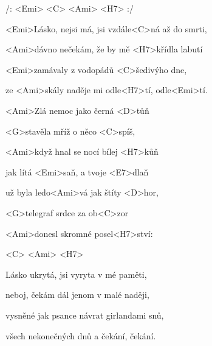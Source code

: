 

/: <Emi> <C> <Ami> <H7> :/

\zs
<Emi>Lásko, nejsi má, jsi vzdále<C>ná až do smrti,

<Ami>dávno nečekám, že by mě <H7>křídla labutí

<Emi>zamávaly z vodopádů <C>šedivýho dne,

ze <Ami>skály naděje mi odle<H7>tí, odle<Emi>tí.
\ks

\zr
<Ami>Zlá nemoc jako černá <D>tůň

<G>stavěla mříž o něco <C>spíš,

<Ami>když hnal se nocí bílej <H7>kůň

jak lítá <Emi>saň, a tvoje <E7>dlaň

už byla ledo<Ami>vá jak štíty <D>hor,

<G>telegraf srdce za ob<C>zor

<Ami>donesl skromné posel<H7>ství:

 <C> <Ami> <H7>
\kr

\zs
Lásko ukrytá, jsi vyryta v mé paměti,

neboj, čekám dál jenom v malé naději,

vysněné jak psance návrat girlandami snů,

všech nekonečných dnů a čekání, čekání.
\ks

\zr\kr

\kp
